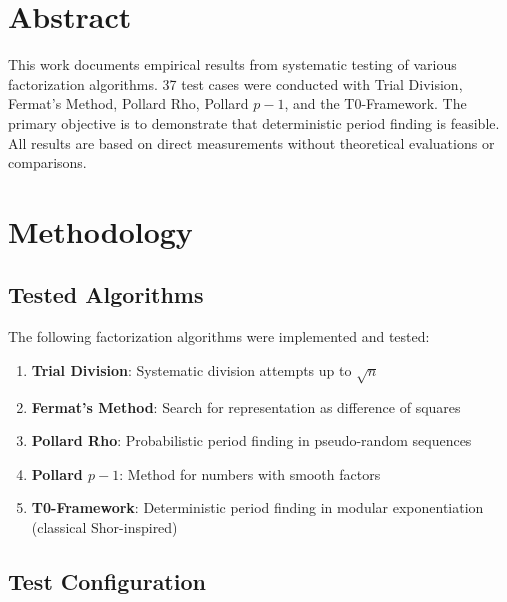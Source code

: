 \section*{Abstract}
		This work documents empirical results from systematic testing of various factorization algorithms. 37 test cases were conducted with Trial Division, Fermat's Method, Pollard Rho, Pollard $p-1$, and the T0-Framework. The primary objective is to demonstrate that deterministic period finding is feasible. All results are based on direct measurements without theoretical evaluations or comparisons.

	
	
	\section{Methodology}
	
	\subsection{Tested Algorithms}
	
	The following factorization algorithms were implemented and tested:
	
	\begin{enumerate}
		\item \textbf{Trial Division}: Systematic division attempts up to $\sqrt{n}$
		\item \textbf{Fermat's Method}: Search for representation as difference of squares
		\item \textbf{Pollard Rho}: Probabilistic period finding in pseudo-random sequences
		\item \textbf{Pollard $p-1$}: Method for numbers with smooth factors
		\item \textbf{T0-Framework}: Deterministic period finding in modular exponentiation (classical Shor-inspired)
	\end{enumerate}
	
	\subsection{Test Configuration}
	
	\begin{table}[H]
		\centering
		\caption{Experimental Parameters}
		\label{tab:test_config}
	\end{table}
	
